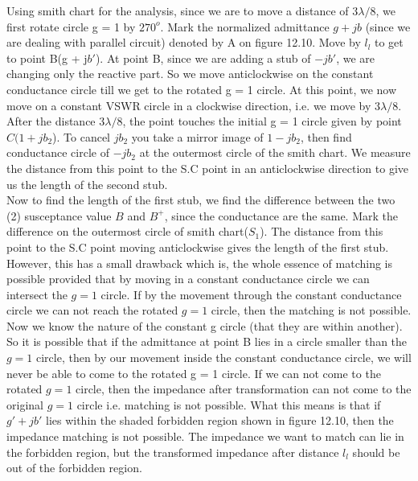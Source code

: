 Using smith chart for the analysis, since we are to move a distance of $3\lambda/8$, we first rotate circle g = 1  by $270^o$. Mark the normalized admittance $g + jb$  (since we are dealing with parallel circuit) denoted by A on figure 12.10. Move by $l_l$ to get to point B(g + j$b'$). At point B, since we are adding a stub of $-jb'$, we are changing only the reactive part. So we move anticlockwise on the constant conductance circle till we get to the rotated g = 1 circle. At this point, we now move on a constant VSWR circle in a clockwise direction, i.e. we move by $ 3\lambda/8$. After the distance $ 3\lambda/8$, the point touches the initial g = 1 circle given by point $C (1+ jb_2$). To cancel $jb_2$ you take a mirror image of $1-jb_2$, then find conductance circle of $ -jb_2$ at the outermost circle of the smith chart. We measure the distance from this point to the S.C point in an anticlockwise direction to give us the length of the second stub.\\

Now to find the length of the first stub, we find the difference between the two (2) susceptance value $B$ and $B^+$, since the conductance are the same. Mark the difference on the outermost circle of smith chart($S_1$). The distance from this point to the S.C point moving anticlockwise gives the length of the first stub. \\

However, this has a small drawback which is, the whole essence of matching is possible provided that by moving in a constant conductance circle we can intersect the $g = 1$ circle. If by the movement through the constant conductance circle we can not reach the rotated $g = 1$ circle, then the matching is not possible. Now we know the nature of the constant g circle (that they are within another). So it is possible that if the admittance at point B lies in a circle smaller than the $g = 1$ circle, then by our movement inside the constant conductance circle, we will never be able to come to the rotated g = 1 circle. If we can not come to the rotated $g = 1$ circle, then the impedance after transformation can not come to the original $g =1$ circle i.e. matching is not possible. What this means is that if $g' + jb'$ lies within the shaded forbidden region shown in figure 12.10, then the impedance matching is not possible. The impedance we want to match can lie in the forbidden region, but the transformed impedance after distance $ l_l$ should be out of the forbidden region.\\

